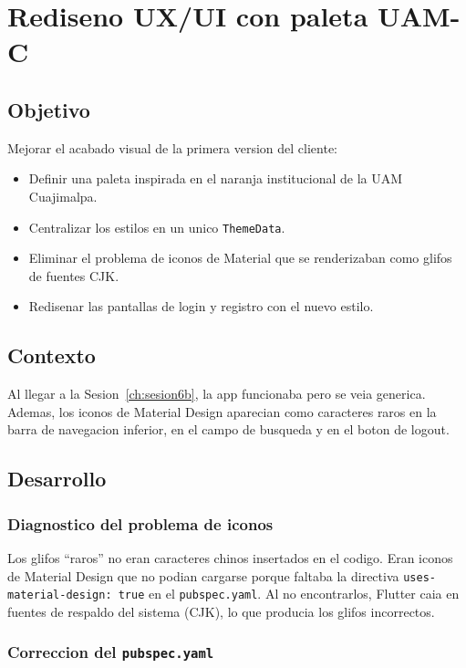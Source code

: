 \chapter{Rediseno UX/UI con paleta UAM-C}
\label{ch:rediseno}

\section{Objetivo}

Mejorar el acabado visual de la primera version del cliente:

\begin{itemize}[leftmargin=*]
  \item Definir una paleta inspirada en el naranja institucional de la UAM Cuajimalpa.
  \item Centralizar los estilos en un unico \texttt{ThemeData}.
  \item Eliminar el problema de iconos de Material que se renderizaban como glifos de fuentes CJK.
  \item Redisenar las pantallas de login y registro con el nuevo estilo.
\end{itemize}

\section{Contexto}

Al llegar a la Sesion~\ref{ch:sesion6b}, la app funcionaba pero se veia generica. Ademas, los iconos de Material Design aparecian como caracteres raros en la barra de navegacion inferior, en el campo de busqueda y en el boton de logout.

\section{Desarrollo}

\subsection{Diagnostico del problema de iconos}

Los glifos ``raros'' no eran caracteres chinos insertados en el codigo. Eran iconos de Material Design que no podian cargarse porque faltaba la directiva \texttt{uses-material-design: true} en el \texttt{pubspec.yaml}. Al no encontrarlos, Flutter caia en fuentes de respaldo del sistema (CJK), lo que producia los glifos incorrectos.

\subsection{Correccion del \texttt{pubspec.yaml}}

